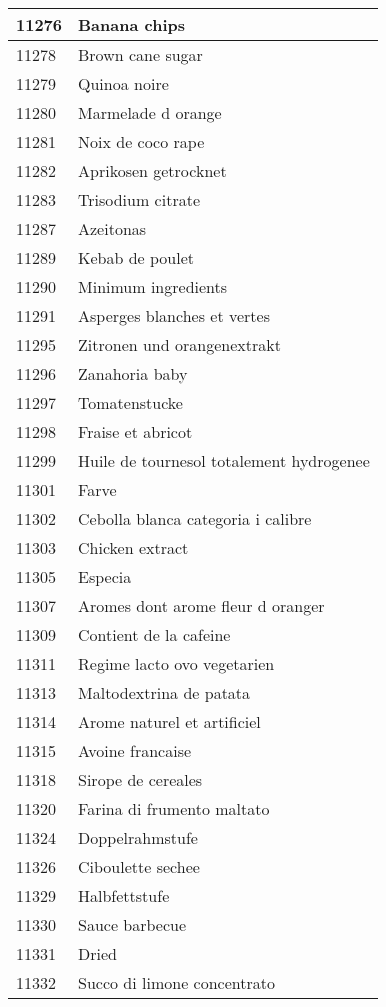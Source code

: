 \begin{longtable}{|l|l|}
11276 & Banana chips \\ \hline 
11278 & Brown cane sugar \\ \hline 
11279 & Quinoa noire \\ \hline 
11280 & Marmelade d orange \\ \hline 
11281 & Noix de coco rape \\ \hline 
11282 & Aprikosen getrocknet \\ \hline 
11283 & Trisodium citrate \\ \hline 
11287 & Azeitonas \\ \hline 
11289 & Kebab de poulet \\ \hline 
11290 & Minimum ingredients \\ \hline 
11291 & Asperges blanches et vertes \\ \hline 
11295 & Zitronen und orangenextrakt \\ \hline 
11296 & Zanahoria baby \\ \hline 
11297 & Tomatenstucke \\ \hline 
11298 & Fraise et abricot \\ \hline 
11299 & Huile de tournesol totalement hydrogenee \\ \hline 
11301 & Farve \\ \hline 
11302 & Cebolla blanca categoria i calibre \\ \hline 
11303 & Chicken extract \\ \hline 
11305 & Especia \\ \hline 
11307 & Aromes dont arome fleur d oranger \\ \hline 
11309 & Contient de la cafeine \\ \hline 
11311 & Regime lacto ovo vegetarien \\ \hline 
11313 & Maltodextrina de patata \\ \hline 
11314 & Arome naturel et artificiel \\ \hline 
11315 & Avoine francaise \\ \hline 
11318 & Sirope de cereales \\ \hline 
11320 & Farina di frumento maltato \\ \hline 
11324 & Doppelrahmstufe \\ \hline 
11326 & Ciboulette sechee \\ \hline 
11329 & Halbfettstufe \\ \hline 
11330 & Sauce barbecue \\ \hline 
11331 & Dried \\ \hline 
11332 & Succo di limone concentrato \\ \hline 

\end{longtable}

